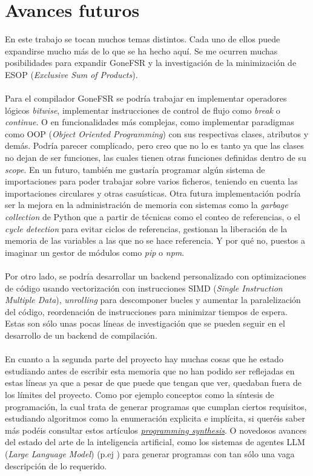 \section{Avances futuros}
En este trabajo se tocan muchos temas distintos. Cada uno de ellos puede expandirse mucho más de lo que se ha hecho aquí. Se me ocurren muchas posibilidades para expandir GoneFSR y la investigación de la minimización de ESOP (\textit{Exclusive Sum of Products}).\\\\
Para el compilador GoneFSR se podría trabajar en implementar operadores lógicos \textit{bitwise}, implementar instrucciones de control de flujo como \textit{break} o \textit{continue}. O en funcionalidades más complejas, como implementar paradigmas como OOP (\textit{Object Oriented Programming}) con sus respectivas clases, atributos y demás. Podría parecer complicado, pero creo que no lo es tanto ya que las clases no dejan de ser funciones, las cuales tienen otras funciones definidas dentro de su \textit{scope}. En un futuro, también me gustaría programar algún sistema de importaciones para poder trabajar sobre varios ficheros, teniendo en cuenta las importaciones circulares y otras casuísticas. Otra futura implementación podría ser la mejora en la administración de memoria con sistemas como la \textit{garbage collection} de Python que a partir de técnicas como el conteo de referencias, o el \textit{cycle detection} para evitar ciclos de referencias, gestionan la liberación de la memoria de las variables a las que no se hace referencia. Y por qué no, puestos a imaginar un gestor de módulos como \textit{pip} o \textit{npm}.\\\\
Por otro lado, se podría desarrollar un backend personalizado con optimizaciones de código usando vectorización con instrucciones SIMD (\textit{Single Instruction Multiple Data}), \textit{unrolling} para descomponer bucles y aumentar la paralelización del código, reordenación de instrucciones para minimizar tiempos de espera. Estas son sólo unas pocas líneas de investigación que se pueden seguir en el desarrollo de un backend de compilación.\\\\
En cuanto a la segunda parte del proyecto hay muchas cosas que he estado estudiando antes de escribir esta memoria que no han podido ser reflejadas en estas líneas ya que a pesar de que puede que tengan que ver, quedaban fuera de los límites del proyecto. Como por ejemplo conceptos como la síntesis de programación, la cual trata de generar programas que cumplan ciertos requisitos, estudiando algoritmos como la enumeración explicita e implícita, si queréis saber más podéis consultar estos artículos \href{https://people.csail.mit.edu/asolar/SynthesisCourse/Lecture1.htm}{\textit{programming synthesis}}. O novedosos avances del estado del arte de la inteligencia artificial, como los sistemas de agentes LLM (\textit{Large Language Model}) (p.ej \cite{islam2024mapcoder}) para generar programas con tan sólo una vaga descripción de lo requerido.\\\\
